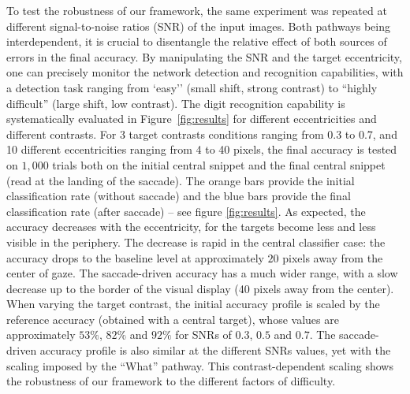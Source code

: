 To test the robustness of our framework, the same experiment was repeated at different signal-to-noise ratios (SNR) of the input images. Both pathways being interdependent, it is crucial to disentangle the relative effect of both sources of errors in the final accuracy. By manipulating the SNR and the target eccentricity, one can precisely monitor the network detection and recognition capabilities, with a detection task ranging from `easy'' (small shift, strong contrast) to ``highly difficult'' (large shift, low contrast). The  digit recognition capability is systematically evaluated in Figure~\ref{fig:results} for different eccentricities and different contrasts.
For 3 target contrasts conditions ranging from 0.3 to 0.7, and 10 different eccentricities ranging from 4 to 40 pixels, the final accuracy is tested on $1,000$ trials both on the initial central snippet and the final central snippet (read at the landing of the saccade).
The orange bars provide the initial classification rate (without saccade) and the blue bars provide the final classification rate (after saccade) -- see figure \ref{fig:results}.  As expected, the accuracy decreases with the eccentricity, for the targets become less and less visible in the periphery. The decrease is rapid in the central classifier case: the accuracy drops to the baseline level
at approximately $20$ pixels away from the center of gaze. The saccade-driven accuracy has a much wider range, with a slow decrease up to the border of the visual display (40 pixels away from the center).
When varying the target contrast, the initial accuracy profile is scaled by the reference accuracy (obtained with a central target), whose values are approximately $53\%$, $82\%$ and $92\%$ for SNRs of $0.3$, $0.5$ and $0.7$. The saccade-driven accuracy profile is also similar at the different SNRs values, yet with the scaling imposed by the ``What'' pathway. This contrast-dependent scaling shows the robustness of our framework to the different factors of difficulty.

